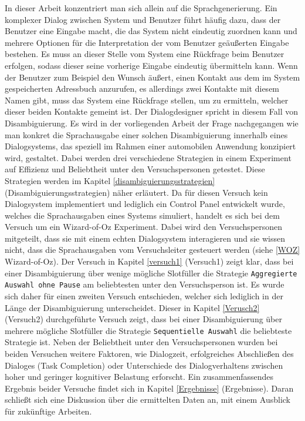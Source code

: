 \documentclass[12pt,a4paper]{scrartcl}
\begin{document}
In dieser Arbeit konzentriert man sich allein auf die Sprachgenerierung. Ein komplexer Dialog zwischen System und Benutzer führt häufig dazu, dass der Benutzer eine Eingabe macht, die das System nicht eindeutig zuordnen kann und mehrere Optionen für die Interpretation der vom Benutzer geäußerten Eingabe bestehen. Es muss an dieser Stelle vom System eine Rückfrage beim Benutzer erfolgen, sodass dieser seine vorherige Eingabe eindeutig übermitteln kann. Wenn der Benutzer zum Beispiel den Wunsch äußert, einen Kontakt aus dem im System gespeicherten Adressbuch anzurufen, es allerdings zwei Kontakte mit diesem Namen gibt, muss das System eine Rückfrage stellen, um zu ermitteln, welcher dieser beiden Kontakte gemeint ist. Der Dialogdesigner spricht in diesem Fall von Disambiguierung.  Es wird in der vorliegenden Arbeit der Frage nachgegangen wie man konkret die Sprachausgabe einer solchen Disambiguierung innerhalb eines Dialogsystems, das speziell im Rahmen einer automobilen Anwendung konzipiert wird, gestaltet. Dabei werden drei verschiedene Strategien in einem Experiment auf Effizienz und Beliebtheit unter den Versuchspersonen getestet. Diese Strategien werden im Kapitel \ref{disambiguierungsstrategien} (Disambiguierungsstrategien) näher erläutert. Da für diesen Versuch kein Dialogsystem implementiert und lediglich ein Control Panel entwickelt wurde, welches die Sprachausgaben eines Systems simuliert, handelt es sich bei dem Versuch um ein Wizard-of-Oz Experiment. Dabei wird den Versuchspersonen mitgeteilt, dass sie mit einem echten Dialogsystem interagieren und sie wissen nicht, dass die Sprachausgaben vom Versuchsleiter gesteuert werden (siehe \ref{WOZ} Wizard-of-Oz). Der Versuch in Kapitel \ref{versuch1}  (Versuch1) zeigt klar, dass bei einer Disambiguierung über wenige mögliche Slotfüller die Strategie \texttt{Aggregierte Auswahl ohne Pause} am beliebtesten unter den Versuchsperson ist. Es wurde sich daher für einen zweiten Versuch entschieden, welcher sich lediglich in der Länge der Disambiguierung unterscheidet. Dieser in Kapitel \ref{Verusch2} (Versuch2) durchgeführte Versuch zeigt, dass bei einer Disambiguierung über mehrere mögliche Slotfüller die Strategie \texttt{Sequentielle Auswahl} die beliebteste Strategie ist. Neben der Beliebtheit unter den Versuchspersonen wurden bei beiden Versuchen weitere Faktoren, wie Dialogzeit, erfolgreiches Abschließen des Dialoges (Task Completion) oder Unterschiede des Dialogverhaltens zwischen hoher und geringer kognitiver Belastung erforscht. Ein zusammenfassendes Ergebnis beider Versuche findet sich in Kapitel \ref{Ergebnisse} (Ergebnisse). Daran schließt sich eine Diskussion über die ermittelten Daten an, mit einem Ausblick für zukünftige Arbeiten. 
\end{document}
